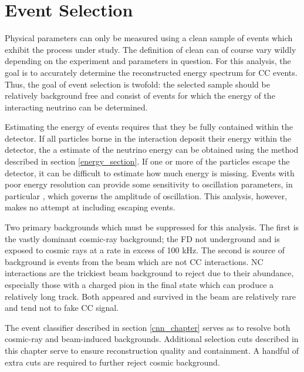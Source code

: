 \chapter{Event Selection}
\label{event_selection_chapter}

Physical parameters can only be measured using a clean sample of events
which exhibit the process under study.
The definition of clean can of course vary wildly depending on the
experiment and parameters in question.
For this analysis, the goal is to accurately determine the reconstructed energy
spectrum for \numu CC events.
Thus, the goal of event selection is twofold: the selected sample should be
relatively background free and consist of events for which the energy of the
interacting neutrino can be determined.

Estimating the energy of events requires that they be fully contained
within the detector.
If all particles borne in the interaction deposit their energy within
the detector, the a estimate of the neutrino energy can be obtained using
the method described in section \ref{energy_section}.
If one or more of the particles escape the detector, it can be difficult
to estimate how much energy is missing.
Events with poor energy resolution can provide some sensitivity to oscillation
parameters, in particular \thetatth, which governs the amplitude of oscillation.
This analysis, however, makes no attempt at including escaping events.

Two primary backgrounds which must be suppressed for this analysis.
The first is the vastly dominant cosmic-ray background; the FD not underground
and is exposed to cosmic rays at a rate in excess of 100 kHz.
The second is source of background is events from the \numi beam which are
not \numu CC interactions.
NC interactions are the trickiest beam background to reject due to their
abundance, especially those with a charged pion in the final state which
can produce a relatively long track.
Both appeared and survived \nue in the beam are relatively rare and tend
not to fake \numu CC signal.

The event classifier described in section \ref{cnn_chapter} serves as to resolve
both cosmic-ray and beam-induced backgrounds.
Additional selection cuts described in this chapter serve to ensure
reconstruction quality and containment.
A handful of extra cuts are required to further reject cosmic background.


